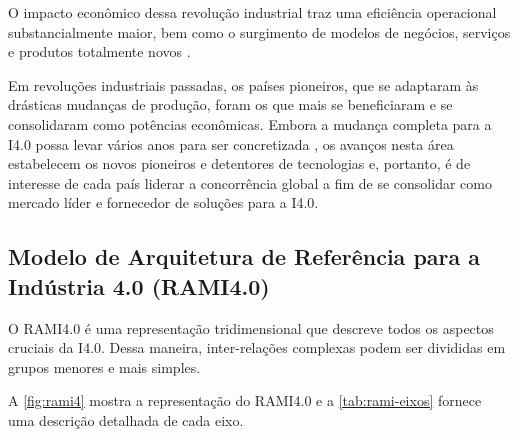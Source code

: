 O impacto econômico dessa revolução industrial traz uma eficiência operacional substancialmente maior, bem como o surgimento de modelos de negócios, serviços e produtos totalmente novos \cite{hermann2016design}.

Em revoluções industriais passadas, os países pioneiros, que se adaptaram às drásticas mudanças de produção, foram os que mais se beneficiaram e se consolidaram como potências econômicas. Embora a mudança completa para a I4.0 possa levar vários anos para ser concretizada \cite{russmann2015industryfour}, os avanços nesta área estabelecem os novos pioneiros e detentores de tecnologias e, portanto, é de interesse de cada país liderar a concorrência global a fim de se consolidar como mercado líder e fornecedor de soluções para a I4.0.

\subsection{Modelo de Arquitetura de Referência para a Indústria 4.0 (RAMI4.0)}
\label{sub:rami4}

O RAMI4.0 é uma representação tridimensional que descreve todos os aspectos cruciais da I4.0. Dessa maneira, inter-relações complexas podem ser divididas em grupos menores e mais simples.

A \autoref{fig:rami4} mostra a representação do RAMI4.0 e a \autoref{tab:rami-eixos} fornece uma descrição detalhada de cada eixo.

